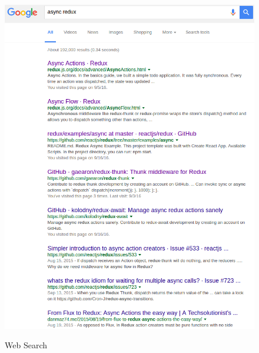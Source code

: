 \documentclass[a4paper,11pt]{article}
\begin{document}
\begin{figure}[h]
%
  {\includegraphics[scale=0.5]{googleWWWSearch.png}}
\caption{Web Search}
\label{fig:wwwsearch}
\end{figure}
\end{document}

